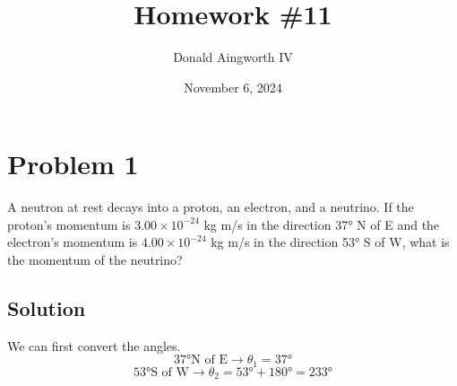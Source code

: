 \documentclass[12pt]{article}
\title{Homework \#11}
\author{Donald Aingworth IV}
\date{November 6, 2024}
\begin{document}

\maketitle

\pagebreak
\section*{Problem 1}
A neutron at rest decays into a proton, an electron, and a neutrino. If the proton's momentum is $3.00\times10^{-24}$ kg m/s in the direction 37\unit{\degree} N of E and the electron's momentum is $4.00\times10^{-24}$ kg m/s in the direction 53\unit{\degree} S of W, what is the momentum of the neutrino?

\subsection*{Solution}
We can first convert the angles. 
\[ 37\unit{\degree} \text{N of E} \rightarrow \theta_1 = 37\unit{\degree} \]
\[ 53\unit{\degree} \text{S of W} \rightarrow \theta_2 = 53\unit{\degree} + 180\unit{\degree} = 233\unit{\degree} \]
\end{document}
